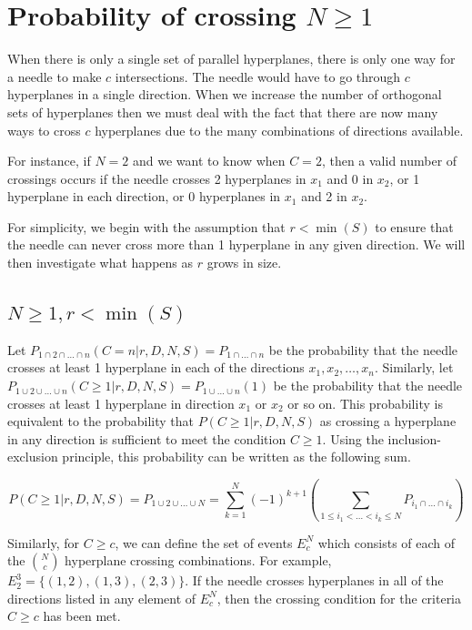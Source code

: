 \documentclass{article}
\begin{document}
\section{Probability of crossing $N\ge 1$}
When there is only a single set of parallel hyperplanes, there is only one way for a needle to make
$c$ intersections. The needle would have to go through $c$ hyperplanes in a single direction.
When we increase the number of orthogonal sets of hyperplanes then we must deal with the fact that
there are now many ways to cross $c$ hyperplanes due to the many combinations of directions available.

For instance, if $N=2$ and we want to know when $C=2$, then a valid number of crossings occurs if the
needle crosses 2 hyperplanes in $x_1$ and 0 in $x_2$, or 1 hyperplane in each direction, or 0 hyperplanes
in $x_1$ and 2 in $x_2$.

For simplicity, we begin with the assumption that $r<\min(S)$ to ensure that the needle can never cross
more than 1 hyperplane in any given direction. We will then investigate what happens as $r$ grows in
size.

\subsection{$N\ge 1, r<\min(S)$}
Let $P_{1\cap2\cap\hdots\cap n}(C=n|r,D,N,S)=P_{1\cap\hdots\cap n}$ be the probability that the
needle crosses at least 1 hyperplane in each of the directions $x_1, x_2, \hdots, x_n$. Similarly,
let $P_{1\cup2\cup\hdots\cup n}(C\ge 1|r,D,N,S)=P_{1\cup\hdots\cup n}(1)$ be the probability that
the needle crosses at least 1 hyperplane in direction $x_1$ or $x_2$ or so on. This probability
is equivalent to the probability that $P(C\ge 1|r,D,N,S)$ as crossing a hyperplane in any 
direction is sufficient to meet the condition $C\ge 1$. Using the inclusion-exclusion principle,
this probability can be written as the following sum.

\begin{equation}
	P(C\ge 1|r, D, N, S) = P_{1\cup2\cup\hdots\cup N} = \sum_{k=1}^N (-1)^{k+1}\left(\sum_{1\le i_1 < \hdots < i_k \le N}P_{i_1 \cap \hdots \cap i_k} \right)
\end{equation}

Similarly, for $C\ge c$, we can define the set of events $E_c^N$ which consists of each of the
$N \choose c$ hyperplane crossing combinations. For example, $E_2^3=\{(1,2), (1,3), (2,3)\}$.
If the needle crosses hyperplanes in all of the directions listed in any element of $E_c^N$,
then the crossing condition for the criteria $C \ge c$ has been met.
\end{document}
